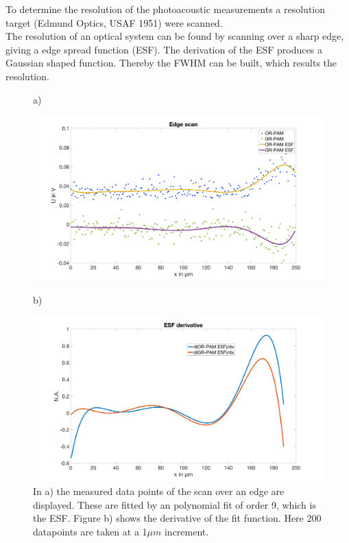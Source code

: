 To determine the resolution of the photoacoustic measurements a resolution target (Edmund Optics, USAF 1951) were scanned. \\
The resolution of an optical system can be found by scanning over a sharp edge, giving a edge spread function (ESF). The derivation of the ESF produces a Gaussian shaped function. Thereby the FWHM can be built, which results the resolution.\\

 \begin{figure}[H]
 	a)
 	\begin{minipage}{0.5\textwidth}		
 		\includegraphics[width = \textwidth, height=0.25\textheight]{04_ex-results_of_PAM/images/ESF.png}
 	\end{minipage}	
 	b)
 	\begin{minipage}{0.5\textwidth}		
 		\includegraphics[width = \textwidth, height=0.25\textheight]{04_ex-results_of_PAM/images/ESFderivative.png}
 	\end{minipage}
 	
 	\caption{In a) the measured data points of the scan over an edge are displayed. These are fitted by an polynomial fit of order 9, which is the ESF. Figure b) shows the derivative of the fit function. Here 200 datapoints are taken at a 1$\mu m$ increment.}
 	\label{fig:ESF}
 \end{figure}

